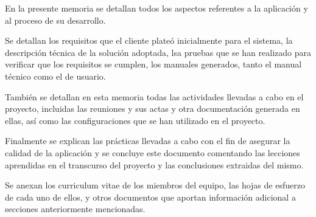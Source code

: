 En la presente memoria se detallan todos los aspectos referentes a la aplicación y al proceso de su desarrollo.

Se detallan los requisitos que el cliente plateó inicialmente para el sistema, la descripción técnica de la solución adoptada, lsa pruebas que se han realizado para verificar que los requisitos se cumplen, los manuales generados, tanto el manual técnico como el de usuario.

También se detallan en esta memoria todas las actividades llevadas a cabo en el proyecto, incluidas las reuniones y sus actas y otra documentación generada en ellas, así como las configuraciones que se han utilizado en el proyecto.

Finalmente se explican las prácticas llevadas a cabo con el fin de asegurar la calidad de la aplicación y se concluye este documento comentando las lecciones aprendidas en el transcurso del proyecto y las conclusiones extraidas del mismo.

Se anexan los curriculum vitae de los miembros del equipo, las hojas de esfuerzo de cada uno de ellos, y otros documentos que aportan información adicional a secciones anteriormente mencionadas.